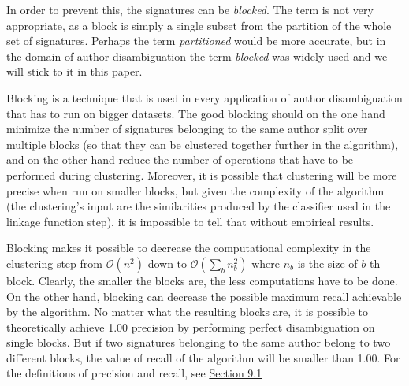 \documentclass{pracamgr}
\newcommand{\myhy}[2]{\hyperref[#1]{#2}}
\begin{document}
In order to prevent this, the signatures can be \textit{blocked}.
The term is not very appropriate,
as a block is simply a single subset from the partition of the whole set of signatures.
Perhaps the term \textit{partitioned} would be more accurate, but in the domain of author
disambiguation the term \textit{blocked} was widely used \citep{fellegi, On,
huang2006efficient, levin2012citation} and we will stick to it in this paper.

Blocking is a technique that is used in every application of author disambiguation
that has to run on bigger datasets. The good blocking should on the one hand
minimize the number of signatures belonging to the same author split over multiple
blocks (so that they can be clustered together further in the algorithm), and on the
other hand reduce the number of operations that have to be performed during clustering.
Moreover, it is possible that clustering will be more precise when run on smaller
blocks, but given the complexity of the algorithm (the clustering's input are the
similarities produced by the classifier used in the linkage function step), it is
impossible to tell that without empirical results.

Blocking makes it possible to decrease the computational complexity in the clustering step
from $\mathcal{O}(n^2)$ down to $\mathcal{O}(\sum_{b} n_b^2)$ where $n_b$ is the size
of $b$-th block. Clearly, the smaller the blocks are, the less computations have to be
done. On the other hand, blocking can decrease the possible maximum recall achievable
by the algorithm. No matter what the resulting blocks are, it is possible to
theoretically achieve 1.00 precision by performing perfect disambiguation on single
blocks. But if two signatures belonging to the same author belong to two different
blocks, the value of recall of the algorithm will be smaller than 1.00. For the definitions of
precision and recall, see \myhy{sec:evaluation}{Section 9.1}
\end{document}
